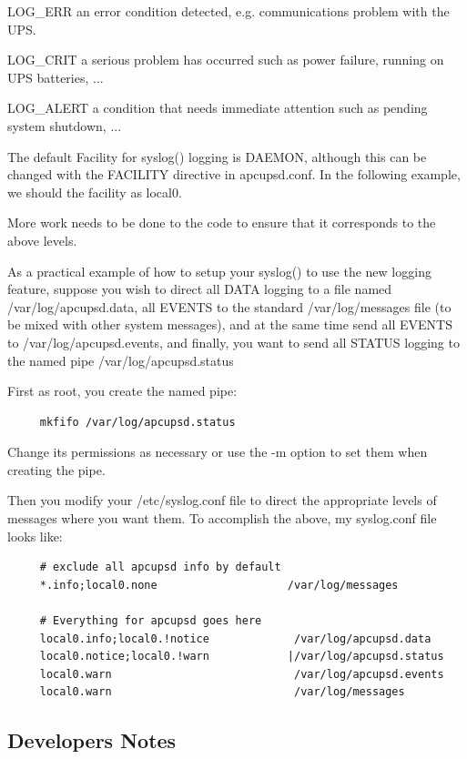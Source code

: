 {{{{{{{LOG\_ERR an error condition detected, e.g. communications problem with the
UPS.  

LOG\_CRIT a serious problem has occurred such as power failure, running on UPS
batteries, ...  

LOG\_ALERT a condition that needs immediate attention such as pending system
shutdown, ...  

The default Facility for syslog() logging is DAEMON, although this can be
changed with the FACILITY directive in apcupsd.conf. In the following example,
we should the facility as local0.  

More work needs to be done to the code to ensure that it corresponds to the
above levels.  

As a practical example of how to setup your syslog() to use the new logging
feature, suppose you wish to direct all DATA logging to a file named
/var/log/apcupsd.data, all EVENTS to the standard /var/log/messages file (to
be mixed with other system messages), and at the same time send all EVENTS to
/var/log/apcupsd.events, and finally, you want to send all STATUS logging to
the named pipe /var/log/apcupsd.status  

First as root, you create the named pipe: 

\footnotesize
\begin{verbatim}
     mkfifo /var/log/apcupsd.status
\end{verbatim}
\normalsize

Change its permissions as necessary or use the -m option to set them when
creating the pipe.  

Then you modify your /etc/syslog.conf file to direct the appropriate levels of
messages where you want them. To accomplish the above, my syslog.conf file
looks like: 

\footnotesize
\begin{verbatim}
     # exclude all apcupsd info by default
     *.info;local0.none                    /var/log/messages
     
     # Everything for apcupsd goes here
     local0.info;local0.!notice             /var/log/apcupsd.data
     local0.notice;local0.!warn            |/var/log/apcupsd.status
     local0.warn                            /var/log/apcupsd.events
     local0.warn                            /var/log/messages
\end{verbatim}
\normalsize

\label{Developers-Notes}

\subsection*{Developers Notes}

}}}}}}}
